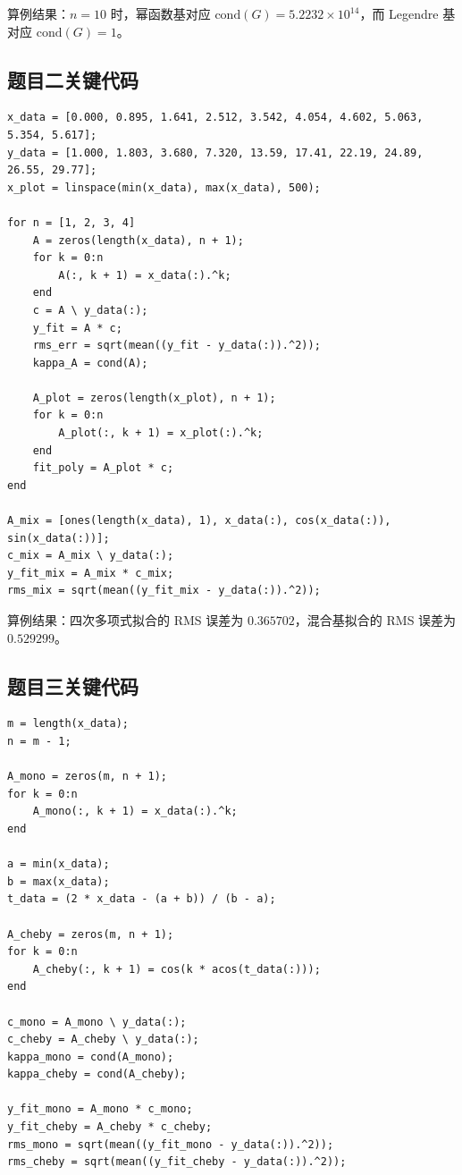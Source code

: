 \documentclass[UTF8,a4paper,11pt]{article}
\begin{document}
算例结果：$n=10$ 时，幂函数基对应 $\mathrm{cond}(G)=5.2232\times10^{14}$，而 Legendre 基对应 $\mathrm{cond}(G)=1$。

\subsection{题目二关键代码}

\begin{lstlisting}[style=matlab, caption={最小二乘拟合的设计矩阵构造、求解与误差计算}]
x_data = [0.000, 0.895, 1.641, 2.512, 3.542, 4.054, 4.602, 5.063, 5.354, 5.617];
y_data = [1.000, 1.803, 3.680, 7.320, 13.59, 17.41, 22.19, 24.89, 26.55, 29.77];
x_plot = linspace(min(x_data), max(x_data), 500);

for n = [1, 2, 3, 4]
    A = zeros(length(x_data), n + 1);
    for k = 0:n
        A(:, k + 1) = x_data(:).^k;
    end
    c = A \ y_data(:);
    y_fit = A * c;
    rms_err = sqrt(mean((y_fit - y_data(:)).^2));
    kappa_A = cond(A);

    A_plot = zeros(length(x_plot), n + 1);
    for k = 0:n
        A_plot(:, k + 1) = x_plot(:).^k;
    end
    fit_poly = A_plot * c;
end

A_mix = [ones(length(x_data), 1), x_data(:), cos(x_data(:)), sin(x_data(:))];
c_mix = A_mix \ y_data(:);
y_fit_mix = A_mix * c_mix;
rms_mix = sqrt(mean((y_fit_mix - y_data(:)).^2));
\end{lstlisting}

算例结果：四次多项式拟合的 RMS 误差为 $0.365702$，混合基拟合的 RMS 误差为 $0.529299$。

\subsection{题目三关键代码}

\begin{lstlisting}[style=matlab, caption={9次多项式拟合中Chebyshev基与幂函数基的对比实现}]
m = length(x_data);
n = m - 1;

A_mono = zeros(m, n + 1);
for k = 0:n
    A_mono(:, k + 1) = x_data(:).^k;
end

a = min(x_data);
b = max(x_data);
t_data = (2 * x_data - (a + b)) / (b - a);

A_cheby = zeros(m, n + 1);
for k = 0:n
    A_cheby(:, k + 1) = cos(k * acos(t_data(:)));
end

c_mono = A_mono \ y_data(:);
c_cheby = A_cheby \ y_data(:);
kappa_mono = cond(A_mono);
kappa_cheby = cond(A_cheby);

y_fit_mono = A_mono * c_mono;
y_fit_cheby = A_cheby * c_cheby;
rms_mono = sqrt(mean((y_fit_mono - y_data(:)).^2));
rms_cheby = sqrt(mean((y_fit_cheby - y_data(:)).^2));
\end{lstlisting}
\end{document}
